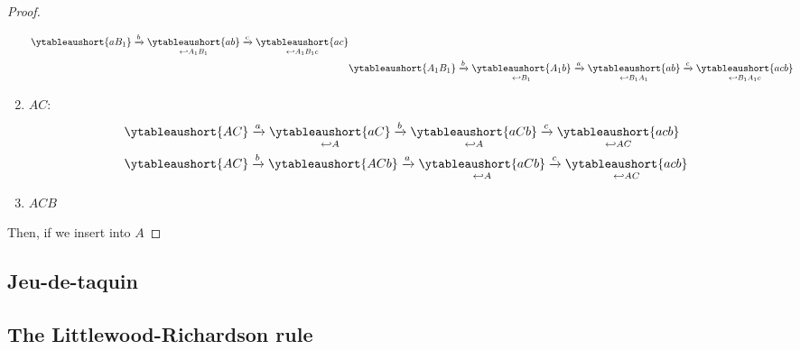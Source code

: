 \documentclass{article}
\begin{document}
\begin{proof}
\begin{enumerate}
\begin{align*}
{                }{\ytableaushort{a{B_1}}}
                \xrightarrow{b}
                \underset{
                    \hookleftarrow A_1B_1
                }{\ytableaushort{ab}}
                \xrightarrow{c}
                \underset{
                    \hookleftarrow A_1B_1c
                }{\ytableaushort{ac}}
                \\
                &
                \ytableaushort{{A_1}{B_1}}
                \xrightarrow{b}
                \underset{
                    \hookleftarrow B_1
                }
                {\ytableaushort{{A_1}b}}
                \xrightarrow{a}
                \underset{
                    \hookleftarrow B_1A_1
                }{\ytableaushort{ab}}
                \xrightarrow{c}
                \underset{
                    \hookleftarrow B_1A_1c
                }{\ytableaushort{acb}}
            \end{align*}
        \item 
            $AC$:
            \begin{align*}
                &
                \ytableaushort{AC}
                \xrightarrow{a}
                \underset{
                    \hookleftarrow A
                }{\ytableaushort{aC}}
                \xrightarrow{b}
                \underset{
                    \hookleftarrow A
                }{\ytableaushort{aCb}}
                \xrightarrow{c}
                \underset{
                    \hookleftarrow AC
                }{\ytableaushort{acb}}
                \\
                &
                \ytableaushort{AC}
                \xrightarrow{b}
                \ytableaushort{ACb}
                \xrightarrow{a}
                \underset{
                    \hookleftarrow A
                }{\ytableaushort{aCb}}
                \xrightarrow{c}
                \underset{
                    \hookleftarrow AC
                }{\ytableaushort{acb}}
            \end{align*}
        \item 
            $ACB$
    \end{enumerate}
    Then, if we insert into $A$
\end{proof}

\subsection{Jeu-de-taquin}

\subsection{The Littlewood-Richardson rule}
\end{document}
